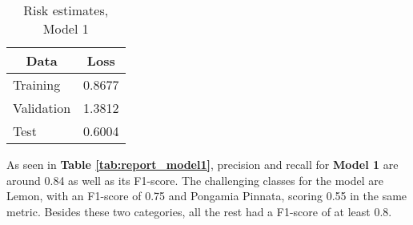 \documentclass[11pt]{article}
\begin{document}
\begin{table}[H]
    \begin{center}
    
    \begin{tabular}{lr}
    \multicolumn{1}{c}{\textbf{Data}} & \multicolumn{1}{c}{\textbf{Loss}} \\ \hline
        Training & 0.8677 \\
        Validation  & 1.3812 \\
        Test  & 0.6004 \\ \hline
    \end{tabular}
    \caption{Risk estimates, Model 1} \label{tab:model1_results}
    
    \end{center}
\end{table}

\begin{table}[H]
    \begin{center}
    
    \end{center}
\end{table}


As seen in \textbf{Table \ref{tab:report_model1}}, precision and recall for \textbf{Model 1} are around 0.84 as well as its F1-score. The challenging classes for the model are Lemon, with an F1-score of 0.75 and Pongamia Pinnata, scoring 0.55 in the same metric. Besides these two categories, all the rest had a F1-score of at least 0.8.\\
\end{document}

